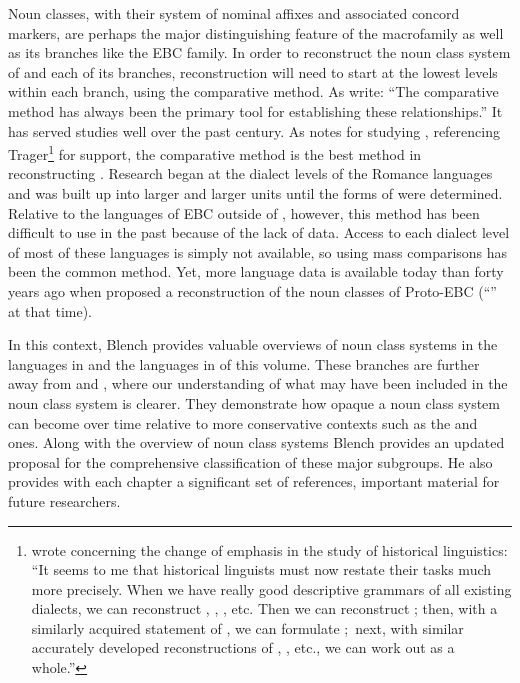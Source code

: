 \documentclass[output=paper]{langsci/langscibook}
\begin{document}
  Noun classes, with their system of nominal affixes and associated concord markers, are perhaps the major distinguishing feature of the  macrofamily as well as its branches like the EBC family. In order to reconstruct the noun class system of  and each of its branches, reconstruction will need to start at the lowest levels within each branch, using the comparative method. As   \citet[162]{CampbellPoser2008} write: “The comparative method has always been the primary tool for establishing these relationships.” It has served  studies well over the past century. As \citet{Hall1950} notes for studying , referencing Trager\footnote{\citet[463]{Trager1946} wrote concerning the change of emphasis in the study of historical linguistics: “It seems to me that historical linguists must now restate their tasks much more precisely. When we have really good descriptive grammars of all existing  dialects, we can reconstruct , , , etc. Then we can reconstruct ; then, with a similarly acquired statement of , we can formulate ;~next, with similar accurately developed reconstructions of , , etc., we can work out  as a whole.”} for support, the comparative method is the best method in reconstructing . Research began at the dialect levels of the Romance languages and was built up into larger and larger units until the forms of  were determined. Relative to the languages of EBC outside of , however, this method has been difficult to use in the past because of the lack of data. Access to each dialect level of most of these languages is simply not available, so using mass comparisons has been the common method.  Yet, more language data is available today than forty years ago when \citet{deWolf1971} proposed a reconstruction of the noun classes of Proto-EBC (“” at that time). 

In this context, Blench provides valuable overviews of noun class systems in the  languages in  and the  languages in  of this volume. These branches are further away from  and , where our understanding of what may have been included in the  noun class system is clearer. They demonstrate how opaque a noun class system can become over time relative to more conservative contexts such as the  and  ones. Along with the overview of noun class systems Blench provides an updated proposal for the comprehensive classification of these major subgroups. He also provides with each chapter a significant set of references, important material for future researchers. 
\end{document}
